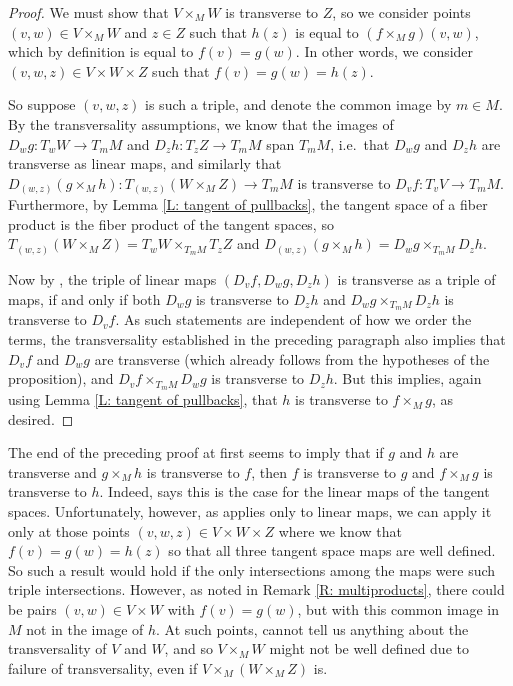 \begin{proof}
	We must show that $V \times _MW$ is transverse to $Z$, so we consider points $(v,w) \in V \times _M W$ and $z \in Z$ such that $h(z)$ is equal to $(f \times _Mg)(v,w)$, which by definition is equal to $f(v) = g(w)$. In other words, we consider $(v,w,z) \in V \times W \times Z$ such that $f(v) = g(w) = h(z)$.

	So suppose $(v,w,z)$ is such a triple, and denote the common image by $m \in M$. By the transversality assumptions, we know that the images of $D_wg \colon T_wW \to T_mM$ and $D_z h \colon T_zZ \to T_mM$ span $T_mM$, i.e.\ that $D_wg$ and $D_zh$ are transverse as linear maps, and similarly that $D_{(w,z)}(g \times _M h) \colon T_{(w,z)}(W \times _M Z) \to T_mM$ is transverse to $D_vf \colon T_vV \to T_mM$. Furthermore, by Lemma \ref{L: tangent of pullbacks}, the tangent space of a fiber product is the fiber product of the tangent spaces, so $T_{(w,z)}(W \times _M Z) = T_wW \times _{T_mM}T_zZ$ and $D_{(w,z)}(g \times _M h) = D_wg \times _{T_mM}D_zh$.

	Now by \cite[Propositions~4-9]{RamBas09}, the triple of linear maps $(D_vf,D_wg,D_zh)$ is transverse as a triple of maps, if and only if both $D_wg$ is transverse to $D_zh$ and $D_wg \times _{T_mM}D_zh$ is transverse to $D_vf$. As such statements are independent of how we order the terms, the transversality established in the preceding paragraph also implies that $D_vf$ and $D_wg$ are transverse (which already follows from the hypotheses of the proposition), and $D_vf \times _{T_mM}D_wg$ is transverse to $D_zh$. But this implies, again using Lemma \ref{L: tangent of pullbacks}, that $h$ is transverse to $f \times _Mg$, as desired.
\end{proof}

\begin{remark}
	The end of the preceding proof at first seems to imply that if $g$ and $h$ are transverse and $g \times _M h$ is transverse to $f$, then $f$ is transverse to $g$ and $f \times _Mg$ is transverse to $h$. Indeed, \cite[Propositions~4-9]{RamBas09} says this is the case for the linear maps of the tangent spaces. Unfortunately, however, as \cite[Propositions~4-9]{RamBas09} applies only to linear maps, we can apply it only at those points $(v,w,z) \in V \times W \times Z$ where we know that $f(v) = g(w) = h(z)$ so that all three tangent space maps are well defined. So such a result would hold if the only intersections among the maps were such triple intersections. However, as noted in Remark \ref{R: multiproducts}, there could be pairs $(v,w) \in V \times W$ with $f(v) = g(w)$, but with this common image in $M$ not in the image of $h$. At such points, \cite[Propositions~4-9]{RamBas09} cannot tell us anything about the transversality of $V$ and $W$, and so $V \times _MW$ might not be well defined due to failure of transversality, even if $V \times _M (W \times _M Z)$ is.
\end{remark}